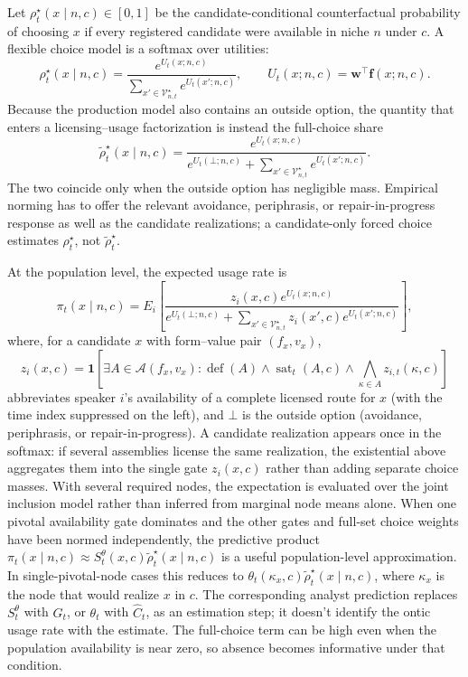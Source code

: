 Let $\rho_t^\star(x\mid n,c)\in[0,1]$ be the candidate-conditional
counterfactual probability of choosing $x$ if every registered candidate were
available in niche $n$ under $c$. A flexible choice model is a softmax over
utilities:
\[
\rho_t^\star(x\mid n,c)=
\frac{e^{U_t(x;n,c)}}{\sum_{x'\in\mathcal{V}_{n,t}^{\star}}e^{U_t(x';n,c)}},
\qquad
U_t(x;n,c)=\mathbf{w}^{\top}\mathbf{f}(x;n,c).
\]
Because the production model also contains an outside option, the quantity that
enters a licensing--usage factorization is instead the full-choice share
\[
\widetilde{\rho}_t^\star(x\mid n,c)=
\frac{e^{U_t(x;n,c)}}
{e^{U_t(\bot;n,c)}+
 \sum_{x'\in\mathcal{V}_{n,t}^{\star}}e^{U_t(x';n,c)}}.
\]
The two coincide only when the outside option has negligible mass. Empirical
norming has to offer the relevant avoidance, periphrasis, or
repair-in-progress response as well as the candidate realizations; a
candidate-only forced choice estimates $\rho_t^\star$, not
$\widetilde{\rho}_t^\star$.

At the population level, the expected usage rate is
\[
\pi_t(x\mid n,c)=
E_i\!\left[
\frac{z_i(x,c)e^{U_t(x;n,c)}}
{e^{U_t(\bot;n,c)}+
\sum_{x'\in\mathcal{V}_{n,t}^{\star}}z_i(x',c)e^{U_t(x';n,c)}}
\right],
\]
where, for a candidate $x$ with form--value pair $(f_x,v_x)$,
\[
z_i(x,c)=\mathbf{1}\!\left[
\exists A\in\mathcal{A}(f_x,v_x):
\operatorname{def}(A)\wedge\operatorname{sat}_t(A,c)\wedge
\bigwedge_{\kappa\in A}z_{i,t}(\kappa,c)
\right]
\]
abbreviates speaker $i$'s availability of a complete licensed route for $x$
(with the time index suppressed on the left), and $\bot$ is the outside option
(avoidance, periphrasis, or repair-in-progress). A candidate realization appears
once in the softmax: if several assemblies license the same realization, the
existential above aggregates them into the single gate $z_i(x,c)$ rather than
adding separate choice masses. With several required nodes,
the expectation is evaluated over the joint inclusion model rather than inferred
from marginal node means alone. When one pivotal availability gate dominates
and the other gates and full-set choice weights have been normed independently,
the predictive product
$\pi_t(x\mid n,c)\approx S_t^\theta(x,c)
\widetilde{\rho}_t^\star(x\mid n,c)$ is a useful population-level
approximation. In single-pivotal-node cases this reduces to
$\theta_t(\kappa_x,c)\widetilde{\rho}_t^\star(x\mid n,c)$, where $\kappa_x$ is
the node that would realize $x$ in $c$. The corresponding analyst prediction
replaces $S_t^\theta$ with $G_t$, or $\theta_t$ with $\widehat C_t$, as an
estimation step; it doesn't identify the ontic usage rate with the estimate.
The full-choice term can be high even when the population availability is near
zero, so absence becomes informative under that condition.

